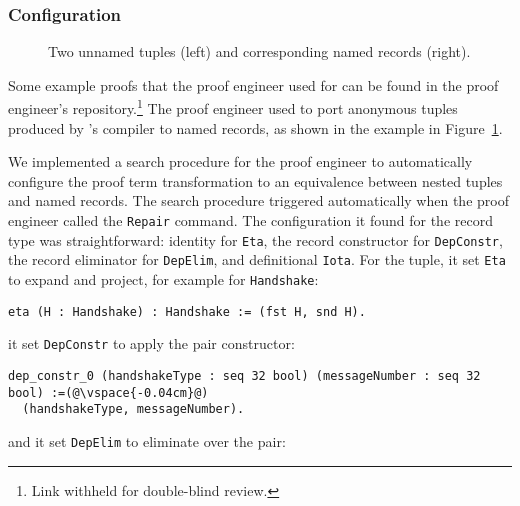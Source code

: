 
\subsubsection{Configuration}

\begin{figure}
\begin{minipage}{0.33\textwidth}
   
\end{minipage}
\hfill
\begin{minipage}{0.66\textwidth}
   
\end{minipage}
\vspace{-0.3cm}
\caption{Two unnamed tuples (left) and corresponding named records (right).}
\label{fig:records}
\end{figure}

Some example proofs that the proof engineer used \toolname for
can be found in the proof engineer's repository.\footnote{Link withheld for double-blind review.}
The proof engineer used \toolname to port anonymous tuples produced by \company's compiler
to named records, as shown in the example in Figure~\ref{fig:records}.

We implemented a search procedure for the proof engineer to automatically configure the proof term transformation to an equivalence
between nested tuples and named records.
The search procedure triggered automatically when the proof engineer called the \lstinline{Repair} command.
The configuration it found for the record type was straightforward: identity for \lstinline{Eta},
the record constructor for \lstinline{DepConstr}, the record eliminator for \lstinline{DepElim}, and definitional \lstinline{Iota}.
For the tuple, it set \lstinline{Eta} to expand and project, for example for \lstinline{Handshake}:
\begin{lstlisting}[backgroundcolor=\color{cyan!30}]
eta (H : Handshake) : Handshake := (fst H, snd H).
\end{lstlisting}
it set \lstinline{DepConstr} to apply the pair constructor:

\begin{lstlisting}[backgroundcolor=\color{cyan!30}]
dep_constr_0 (handshakeType : seq 32 bool) (messageNumber : seq 32 bool) :=(@\vspace{-0.04cm}@)
  (handshakeType, messageNumber).
\end{lstlisting}
and it set \lstinline{DepElim} to eliminate over the pair:

